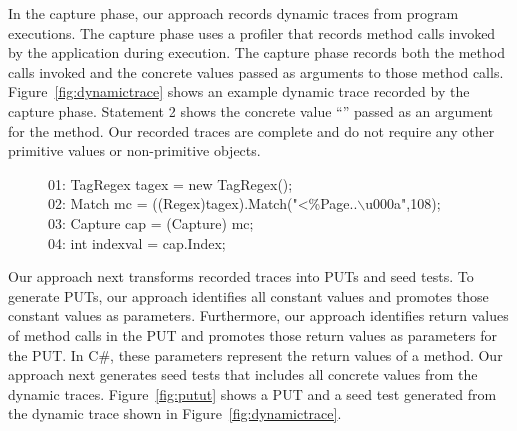 In the capture phase, our approach records dynamic traces from program executions. The capture phase uses a profiler that records method calls invoked by the application during execution. The capture phase records both the method calls invoked and the concrete values passed as arguments to those method calls. Figure~\ref{fig:dynamictrace} shows
an example dynamic trace recorded by the capture phase. Statement 2 shows the concrete value ``'' passed as an argument for the  method. Our recorded traces are complete and do not require any other primitive values or non-primitive objects. 

\begin{figure}[t]
\begin{CodeOut}
01: TagRegex tagex = new TagRegex();\\
02: Match mc = ((Regex)tagex).Match("<\%\@ Page..$\backslash$u000a",108);\\
03: Capture cap = (Capture) mc;\\
04: int indexval = cap.Index;\\
\end{CodeOut}\vspace*{-3ex}
\vspace*{-1ex}
\end{figure}

Our approach next transforms recorded traces into PUTs and seed tests. To generate PUTs, our approach identifies all constant values and promotes those constant values as parameters. Furthermore, our approach identifies return values of method calls in the PUT and promotes those return values as  parameters for the PUT. In C\#, these  parameters represent the return values of a method. Our approach next generates seed tests that includes all concrete values from the dynamic traces. Figure~\ref{fig:putut} shows a PUT and a seed test generated from the dynamic trace shown in Figure~\ref{fig:dynamictrace}.

